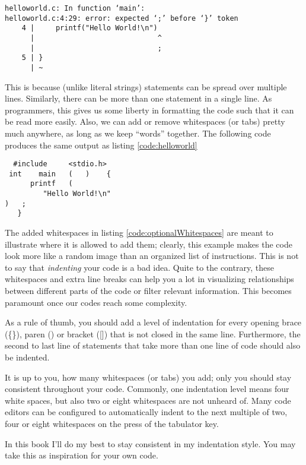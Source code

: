 \begin{cmdbox}
\begin{verbatim}
helloworld.c: In function ‘main’:
helloworld.c:4:29: error: expected ‘;’ before ‘}’ token
    4 |     printf("Hello World!\n")
      |                             ^
      |                             ;
    5 | }
      | ~
\end{verbatim}
\end{cmdbox}

This is because (unlike literal strings) statements can be spread over multiple lines. Similarly, there can be more than one statement in a single line. As programmers, this gives us some liberty in formatting the code such that it can be read more easily. Also, we can add or remove whitespaces (or tabs) pretty much anywhere, as long as we keep \enquote{words} together. The following code produces the same output as listing \ref{code:helloworld}
\begin{codebox}
\begin{verbatim}
  #include     <stdio.h>
 int    main   (   )    {
      printf   (   
         "Hello World!\n"
)   ;
   }
\end{verbatim}
 \label{code:optionalWhitespaces}
\end{codebox}

\begin{hintbox}
The added whitespaces in listing \ref{code:optionalWhitespaces} are meant to illustrate where it is allowed to add them; clearly, this example makes the code look more like a random image than an organized list of instructions. This is not to say that \emph{indenting} your code is a bad idea. Quite to the contrary, these whitespaces and extra line breaks can help you a lot in visualizing relationships between different parts of the code or filter relevant information. This becomes paramount once our codes reach some complexity.

As a rule of thumb, you should add a level of indentation for every opening brace (\{\}), paren () or bracket ([]) that is not closed in the same line. Furthermore, the second to last line of statements that take more than one line of code should also be indented.

It is up to you, how many whitespaces (or tabs) you add; only you should stay consistent throughout your code. Commonly, one indentation level means four white spaces, but also two or eight whitespaces are not unheard of. Many code editors can be configured to automatically indent to the next multiple of two, four or eight whitespaces on the press of the tabulator key.

In this book I'll do my best to stay consistent in my indentation style. You may take this as inspiration for your own code.
\end{hintbox}

